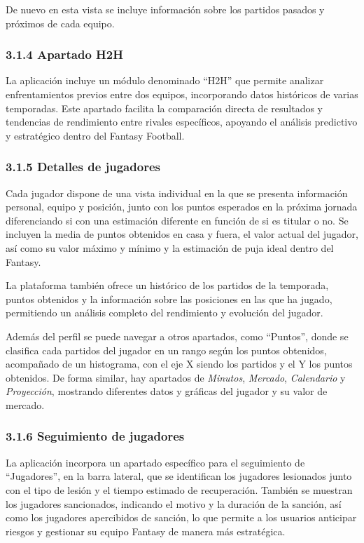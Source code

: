 De nuevo en esta vista se incluye información sobre los partidos pasados y próximos de cada equipo.

\subsubsection{3.1.4 Apartado H2H}

La aplicación incluye un módulo denominado ``H2H'' que permite analizar enfrentamientos previos entre 
dos equipos, incorporando datos históricos de varias temporadas. Este apartado facilita la 
comparación directa de resultados y tendencias de rendimiento entre rivales específicos, apoyando el 
análisis predictivo y estratégico dentro del Fantasy Football.

\subsubsection{3.1.5 Detalles de jugadores}

Cada jugador dispone de una vista individual en la que se presenta información personal, equipo y 
posición, junto con los puntos esperados en la próxima jornada diferenciando si con una estimación 
diferente en función de si es titular o no. Se incluyen la media de puntos obtenidos en casa y 
fuera, el valor actual del jugador, así como su valor máximo y mínimo y la estimación de puja ideal 
dentro del Fantasy.

La plataforma también ofrece un histórico de los partidos de la temporada, puntos obtenidos y la 
información sobre las posiciones en las que ha jugado, permitiendo un análisis completo del 
rendimiento y evolución del jugador.

Además del perfil se puede navegar a otros apartados, como ``Puntos'', donde se clasifica cada 
partidos del jugador en un rango según los puntos obtenidos, acompañado de un histograma, con el eje 
X siendo los partidos y el Y los puntos obtenidos. De forma similar, hay apartados de \textit{Minutos}, 
\textit{Mercado}, \textit{Calendario} y \textit{Proyección}, mostrando diferentes datos y gráficas del jugador y su 
valor de mercado.

\subsubsection{3.1.6 Seguimiento de jugadores}

La aplicación incorpora un apartado específico para el seguimiento de ``Jugadores'', en la barra 
lateral, que se identifican los jugadores lesionados junto con el tipo de lesión y el tiempo 
estimado de recuperación. También se muestran los jugadores sancionados, indicando el motivo y la 
duración de la sanción, así como los jugadores apercibidos de sanción, lo que permite a los usuarios 
anticipar riesgos y gestionar su equipo Fantasy de manera más estratégica.

